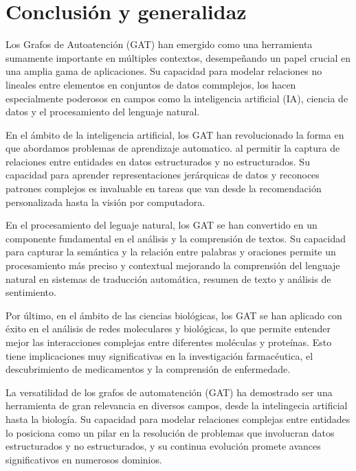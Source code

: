 \documentclass{article}
\begin{document}
\vspace{0.5cm}

\section{Conclusión y generalidaz}

\vspace{1cm}

Los Grafos de Autoatención (GAT) han emergido como una herramienta sumamente importante en múltiples contextos, desempeñando un papel crucial en una amplia gama de aplicaciones. Su capacidad para modelar relaciones no lineales entre elementos en conjuntos de datos commplejos, los hacen especialmente poderosos en campos como la inteligencia artificial (IA), ciencia de datos y el procesamiento del lenguaje natural.

En el ámbito de la inteligencia artificial, los GAT han revolucionado la forma en que abordamos problemas de aprendizaje automatico. al permitir la captura de relaciones entre entidades en datos estructurados y no estructurados. Su capacidad para aprender representaciones jerárquicas de datos y reconoces patrones complejos es invaluable en tareas que van desde la recomendación personalizada hasta la visión por computadora.

En el procesamiento del leguaje natural, los GAT se han convertido en un componente fundamental en el análisis y la comprensión de textos. Su capacidad para capturar la semántica y la relación entre palabras y oraciones permite un procesamiento más preciso y contextual mejorando la comprensión del lenguaje natural en sistemas de traducción automática, resumen de texto y análisis de sentimiento.

Por último, en el ámbito de las ciencias biológicas, los GAT se han aplicado con éxito en el análisis de redes moleculares y biológicas, lo que permite entender mejor las interacciones complejas entre diferentes moléculas y proteínas. Esto tiene implicaciones muy significativas en la investigación farmacéutica, el descubrimiento de medicamentos y la comprensión de enfermedade.

La versatilidad de los grafos de automatención (GAT) ha demostrado ser una herramienta de gran relevancia en diversos campos, desde la intelingecia artificial hasta la biología. Su capacidad para modelar relaciones complejas entre entidades lo posiciona como un pilar en la resolución de problemas que involucran datos estructurados y no estructurados, y su continua evolución promete avances significativos en numerosos dominios.
\end{document}
